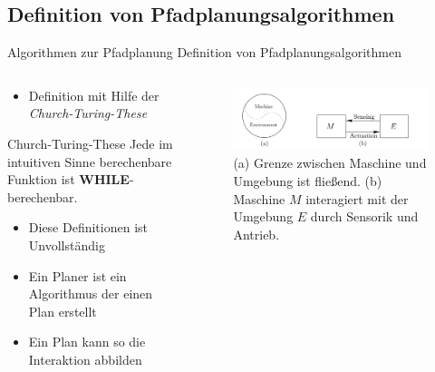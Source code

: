 \documentclass[t,aspectratio=169,dvipsnames]{beamer}
\begin{document}
\subsection{Definition von Pfadplanungsalgorithmen}
	
\begin{frame}{Algorithmen zur Pfadplanung} {Definition von Pfadplanungsalgorithmen}
	\begin{columns}
		\begin{column}[T]{0.6\textwidth}
			\begin{itemize}
				\item  Definition mit Hilfe der \textit{Church-Turing-These}
			\end{itemize}
			\begin{block}{Church-Turing-These}
				Jede im intuitiven Sinne berechenbare Funktion ist \textbf{WHILE}-berechenbar.
			\end{block}
			\begin{itemize}
				\item <2->Diese Definitionen ist Unvollständig
				\item <2->Ein Planer ist ein Algorithmus der einen Plan erstellt
				\item <2->Ein Plan kann so die Interaktion abbilden	
			\end{itemize}
		\end{column}
		\begin{column}[T]{0.4\textwidth}
			\begin{figure}
				\includegraphics[width=6.5cm]{images/img224.png}
				\caption{(a) Grenze zwischen Maschine und Umgebung ist fließend.
					(b) Maschine $M$ interagiert mit der Umgebung $E$ durch Sensorik und Antrieb. } 
			\end{figure}
		\end{column}
	\end{columns}	
\end{frame}
\end{document}

